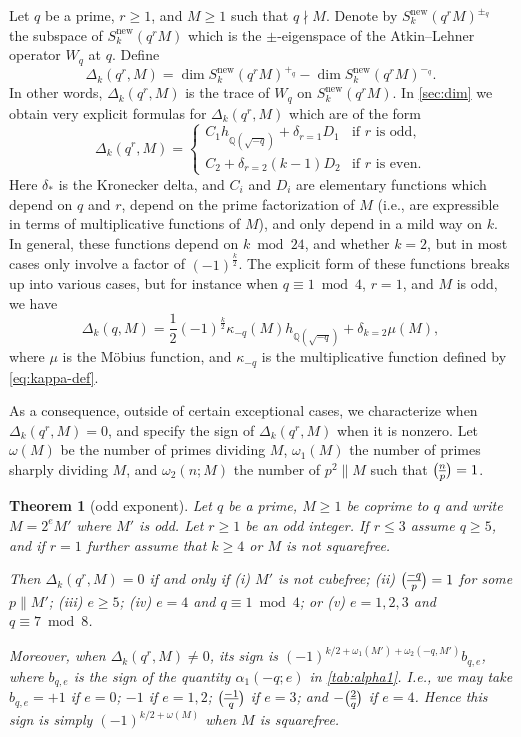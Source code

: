 \documentclass[11pt]{amsart}
\newcommand{\Q}{\mathbb Q}
\newcommand{\new}{\mathrm{new}}
\renewcommand{\mod}{\bmod}
\newcommand{\leg}{\overwithdelims ()}
\numberwithin{lem}{section}
\newtheorem{thm}[lem]{Theorem}
\theoremstyle{remark}
\theoremstyle{definition}
\numberwithin{equation}{section}
\begin{document}
Let $q$ be a prime, $r \ge 1$, and $M \ge 1$ such that $q \nmid M$.  Denote by  
$S_k^\new(q^rM)^{\pm_q}$ the subspace of $S_k^\new(q^r M)$ which is the $\pm$-eigenspace of the Atkin--Lehner operator $W_q$ at $q$.
Define
\[ \Delta_k(q^r, M) =  \dim S_k^\new(q^rM)^{+_q} - \dim S_k^\new(q^rM)^{-_q} .\]
In other words, $\Delta_k(q^r, M)$ is the trace of $W_q$ on $S_k^\new(q^r M)$.
In \cref{sec:dim} we obtain very explicit formulas for $\Delta_k(q^r, M)$ which are of the form
\begin{equation} \label{eq:Deltak-form}
\Delta_k(q^r, M) = 
\begin{cases}
C_1 h_{\Q(\sqrt{-q})} + \delta_{r=1}  D_1 & \text{if } r \text{ is odd}, \\
C_2 +  \delta_{r=2} (k-1) D_2  & \text{if } r \text{ is even}.
\end{cases}
\end{equation}
Here $\delta_*$ is the Kronecker delta, and $C_i$ and $D_i$ are elementary functions which depend on $q$ and $r$, 
depend on the prime factorization of $M$ (i.e., are expressible in terms of multiplicative functions of $M$), and only depend in a mild way on $k$.  In general, these functions depend on $k \mod 24$, and whether $k=2$, but in most cases only involve a factor of $(-1)^\frac k2$.
The explicit form of these functions breaks up into various cases, but for instance when $q \equiv 1 \mod 4$, $r=1$, and $M$ is odd, we have
\[ \Delta_k(q,M) = \frac 12 (-1)^{\frac k2} \kappa_{-q}(M) h_{\Q(\sqrt{-q})}  + \delta_{k=2} \mu(M), \]
where $\mu$ is the M\"obius function, and $\kappa_{-q}$ is the multiplicative function defined by \eqref{eq:kappa-def}.

As a consequence, outside of certain exceptional cases, we characterize when $\Delta_k(q^r,M) = 0$, and specify the sign of $\Delta_k(q^r, M)$ when it is nonzero.  Let $\omega(M)$ be the number of primes dividing $M$, $\omega_1(M)$ the number of primes sharply dividing $M$, and $\omega_2(n; M)$ the number of $p^2 \parallel M$ such that ${n \leg p} = 1$.

\begin{thm} [odd exponent] \label{thm11}
Let $q$ be a prime, $M \ge 1$ be coprime to $q$ and write $M = 2^e M'$ where $M'$ is odd.  Let $r \ge 1$ be an odd integer.  If $r \le 3$ assume $q \ge 5$,
and if $r=1$ further assume that $k \ge 4$ or $M$ is not squarefree.  

Then $\Delta_k(q^r, M) = 0$
if and only if 
(i) $M'$ is not cubefree; (ii) ${-q \leg p} = 1$ for some $p \parallel M'$; (iii) $e \ge 5$;
(iv) $e = 4$ and $q \equiv 1 \mod 4$; or
(v) $e = 1, 2, 3$ and $q \equiv 7 \mod 8$.

Moreover, when $\Delta_k(q^r, M) \ne 0$, its sign is $(-1)^{k/2 + \omega_1(M') + \omega_2(-q, M')} b_{q,e}$, where $b_{q,e}$ is the sign of the quantity $\alpha_1(-q; e)$ in \cref{tab:alpha1}.  I.e., we may take $b_{q,e} = +1$ if $e=0$; $-1$ if $e=1,2$; ${-1 \leg q}$ if $e=3$; and $-{2 \leg q}$ if $e=4$.  Hence this sign is simply $(-1)^{k/2 + \omega(M)}$ when $M$ is squarefree.
\end{thm}
\end{document}
